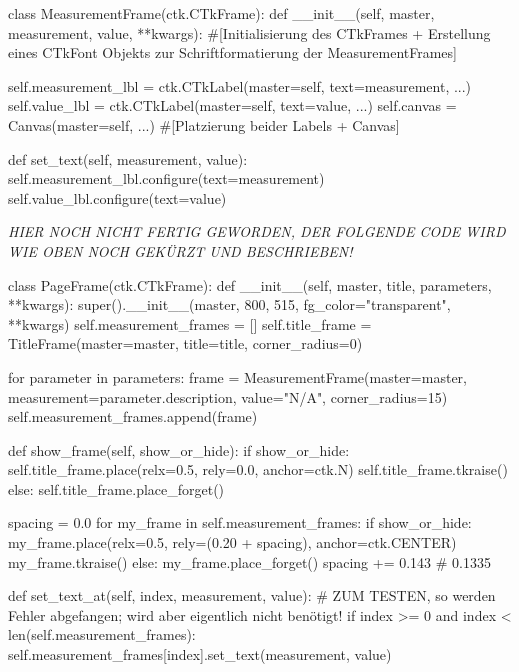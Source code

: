 \begin{pythoncode}
class MeasurementFrame(ctk.CTkFrame):
	def __init__(self, master, measurement, value, **kwargs):
		#[Initialisierung des CTkFrames + Erstellung eines CTkFont Objekts zur Schriftformatierung der MeasurementFrames]
		
		self.measurement_lbl = ctk.CTkLabel(master=self, text=measurement, ...)
		self.value_lbl = ctk.CTkLabel(master=self, text=value, ...)
		self.canvas = Canvas(master=self, ...)
		#[Platzierung beider Labels + Canvas]
		
	def set_text(self, measurement, value):
		self.measurement_lbl.configure(text=measurement)
		self.value_lbl.configure(text=value)
\end{pythoncode}

\textit{HIER NOCH NICHT FERTIG GEWORDEN, DER FOLGENDE CODE WIRD WIE OBEN NOCH GEKÜRZT UND BESCHRIEBEN!}
	
\begin{pythoncode}
class PageFrame(ctk.CTkFrame):
	def __init__(self, master, title, parameters, **kwargs):
		super().__init__(master, 800, 515, fg_color="transparent", **kwargs)
		self.measurement_frames = []
		self.title_frame = TitleFrame(master=master, title=title, corner_radius=0)
		
		for parameter in parameters:
			frame = MeasurementFrame(master=master, measurement=parameter.description, value="N/A", corner_radius=15)
			self.measurement_frames.append(frame)
			
	def show_frame(self, show_or_hide):
		if show_or_hide:
			self.title_frame.place(relx=0.5, rely=0.0, anchor=ctk.N)
			self.title_frame.tkraise()
		else:
			self.title_frame.place_forget()
		
		spacing = 0.0
		for my_frame in self.measurement_frames:
			if show_or_hide:
				my_frame.place(relx=0.5, rely=(0.20 + spacing), anchor=ctk.CENTER)
				my_frame.tkraise()
			else:
				my_frame.place_forget()
			spacing += 0.143  # 0.1335
	
	def set_text_at(self, index, measurement, value):
		# ZUM TESTEN, so werden Fehler abgefangen; wird aber eigentlich nicht benötigt!
		if index >= 0 and index < len(self.measurement_frames):
			self.measurement_frames[index].set_text(measurement, value)
\end{pythoncode}



